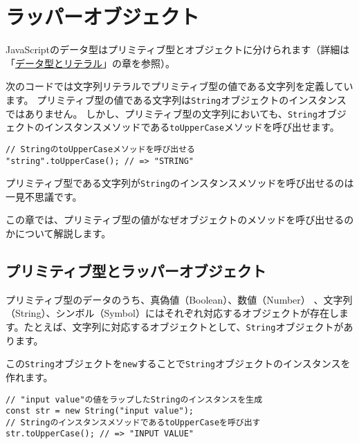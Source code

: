 \hypertarget{wrapper-object}{%
\chapter{ラッパーオブジェクト}\label{wrapper-object}}
\thispagestyle{frontheadings}

JavaScriptのデータ型はプリミティブ型とオブジェクトに分けられます（詳細は「\hyperlink{data-type-and-literal}{データ型とリテラル}」の章を参照）。

次のコードでは文字列リテラルでプリミティブ型の値である文字列を定義しています。
プリミティブ型の値である文字列は\texttt{String}オブジェクトのインスタンスではありません。
しかし、プリミティブ型の文字列においても、\texttt{String}オブジェクトのインスタンスメソッドである\texttt{toUpperCase}メソッドを呼び出せます。

\begin{lstlisting}
// StringのtoUpperCaseメソッドを呼び出せる
"string".toUpperCase(); // => "STRING"
\end{lstlisting}

プリミティブ型である文字列が\texttt{String}のインスタンスメソッドを呼び出せるのは一見不思議です。

この章では、プリミティブ型の値がなぜオブジェクトのメソッドを呼び出せるのかについて解説します。

\hypertarget{primitive-type-and-wrapper-object}{%
\section{プリミティブ型とラッパーオブジェクト}\label{primitive-type-and-wrapper-object}}

プリミティブ型のデータのうち、真偽値（Boolean）、数値（Number）
、文字列（String）、シンボル（Symbol）にはそれぞれ対応するオブジェクトが存在します。たとえば、文字列に対応するオブジェクトとして、\texttt{String}オブジェクトがあります。

この\texttt{String}オブジェクトを\texttt{new}することで\texttt{String}オブジェクトのインスタンスを作れます。

\begin{lstlisting}
// "input value"の値をラップしたStringのインスタンスを生成
const str = new String("input value");
// StringのインスタンスメソッドであるtoUpperCaseを呼び出す
str.toUpperCase(); // => "INPUT VALUE"
\end{lstlisting}

